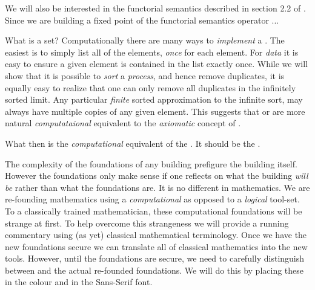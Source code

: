 We will also be interested in the functorial semantics described in 
section 2.2 of \cite{jacobs1999categoricalLogicTypeTheory}. Since we are 
building a fixed point of the functorial semantics operator ...


What is a set? Computationally there are many ways to \emph{implement} a 
. The easiest is to simply list all of the elements, 
\emph{once} for each element. For \emph{data} it is easy to ensure a given 
element is contained in the list exactly once. While we will show that it 
is possible to \emph{sort} a \emph{process}, and hence remove duplicates, 
it is equally easy to realize that one can only remove all duplicates in 
the infinitely sorted limit. Any particular \emph{finite} sorted 
approximation to the infinite sort, may always have multiple copies of any 
given element. This suggests that  or  are 
more natural \emph{computataional} equivalent to the \emph{axiomatic} 
concept of . 

What then is the \emph{computational} equivalent of the . 
It should be the .  


The complexity of the foundations of any building prefigure the building 
itself. However the foundations only make sense if one reflects on what 
the building \emph{will be} rather than what the foundations are. It is no 
different in mathematics. We are re-founding mathematics using a 
\emph{computational} as opposed to a \emph{logical} tool-set. To a 
classically trained mathematician, these computational foundations will be 
strange at first. To help overcome this strangeness we will provide a 
running commentary using (as yet) classical mathematical terminology. Once 
we have the new foundations secure we can translate all of classical 
mathematics into the new tools. However, until the foundations are secure, 
we need to carefully distinguish between  and the actual re-founded foundations. We will do this by 
placing these  in the colour 
\color[blue]{blue} and in the {\sans Sans-Serif font}. 

